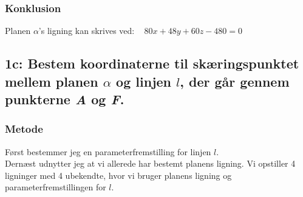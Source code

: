 \documentclass[../main.tex]{subfiles}
\begin{document}
    \subsubsection*{Konklusion}
        Planen \(\alpha\)'s ligning kan skrives ved: \(\; \; \; 80x+48y+60z-480=0\)
\clearpage
\subsection*{1c: Bestem koordinaterne til skæringspunktet mellem planen \(\alpha\) og linjen \(l\), der går gennem punkterne \textit{A} og \textit{F}.}
    \subsubsection*{Metode}
        Først bestemmer jeg en parameterfremstilling for linjen \(l\).\\
        Dernæst udnytter jeg at vi allerede har bestemt planens ligning. Vi opstiller 4 ligninger med 4 ubekendte, hvor vi bruger planens ligning og parameterfremstillingen for \(l\).
\end{document}
